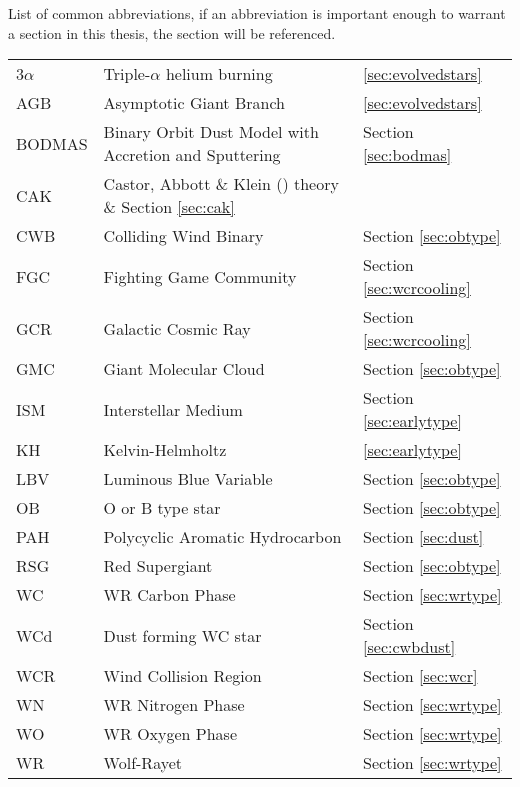 \begin{abbreviations}
List of common abbreviations, if an abbreviation is important enough to warrant a section in this thesis, the section will be referenced.

\begin{table}[h]
  \centering
  \begin{tabular}{l|l|l}
    
    \hline

    3$\alpha$ & Triple-$\alpha$ helium burning & \ref{sec:evolvedstars} \\
    AGB & Asymptotic Giant Branch & \ref{sec:evolvedstars} \\
    BODMAS & Binary Orbit Dust Model with Accretion and Sputtering & Section \ref{sec:bodmas} \\
    CAK & Castor, Abbott \& Klein (\citeyear{castor_radiation-driven_1975}) theory \& Section \ref{sec:cak} \\
    CWB & Colliding Wind Binary  & Section \ref{sec:obtype} \\
    FGC & Fighting Game Community & Section \ref{sec:wcrcooling} \\
    GCR & Galactic Cosmic Ray & Section \ref{sec:wcrcooling} \\
    GMC & Giant Molecular Cloud & Section \ref{sec:obtype}\\
    ISM & Interstellar Medium & Section \ref{sec:earlytype} \\
    KH  & Kelvin-Helmholtz & \ref{sec:earlytype} \\ 
    LBV & Luminous Blue Variable & Section \ref{sec:obtype} \\
    OB  & O or B type star & Section \ref{sec:obtype} \\ 
    PAH & Polycyclic Aromatic Hydrocarbon & Section \ref{sec:dust} \\
    RSG & Red Supergiant & Section \ref{sec:obtype} \\
    WC  & WR Carbon Phase & Section \ref{sec:wrtype} \\
    WCd & Dust forming WC star & Section \ref{sec:cwbdust} \\
    WCR & Wind Collision Region & Section \ref{sec:wcr} \\
    WN  & WR Nitrogen Phase & Section \ref{sec:wrtype} \\
    WO  & WR Oxygen Phase & Section \ref{sec:wrtype} \\
    WR  & Wolf-Rayet & Section \ref{sec:wrtype} \\


\end{tabular}
\end{table}
\end{abbreviations}
